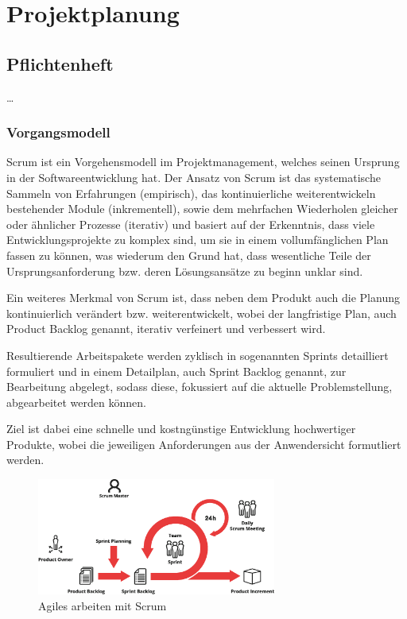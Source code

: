 
\chapter{Projektplanung} \label{Projektplanung}
\section{Pflichtenheft} \label{Pflichtenheft}

\ldots

\subsection{Vorgangsmodell} \label{Vorgangsmodell}
Scrum ist ein Vorgehensmodell im Projektmanagement, welches seinen Ursprung in der Softwareentwicklung hat.
Der Ansatz von Scrum ist das systematische Sammeln von Erfahrungen (empirisch), das kontinuierliche weiterentwickeln bestehender Module (inkrementell), sowie dem mehrfachen Wiederholen gleicher oder ähnlicher Prozesse (iterativ) und basiert auf der Erkenntnis, dass viele Entwicklungsprojekte zu komplex sind, um sie in einem vollumfänglichen Plan fassen zu können, was wiederum den Grund hat, dass wesentliche Teile der Ursprungsanforderung bzw. deren Lösungsansätze zu beginn unklar sind.

Ein weiteres Merkmal von Scrum ist, dass neben dem Produkt auch die Planung kontinuierlich verändert bzw. weiterentwickelt, wobei der langfristige Plan, auch Product Backlog genannt, iterativ verfeinert und verbessert wird.

Resultierende Arbeitspakete werden zyklisch in sogenannten Sprints detailliert formuliert und in einem Detailplan, auch Sprint Backlog genannt, zur Bearbeitung abgelegt, sodass diese, fokussiert auf die aktuelle Problemstellung, abgearbeitet werden können.

Ziel ist dabei eine schnelle und kostngünstige Entwicklung hochwertiger Produkte, wobei die jeweiligen Anforderungen aus der Anwendersicht formutliert werden.

\begin{figure}[h]
 \centering
 \includegraphics[width=0.7\textwidth]{pictures/scrum}
 \caption[Agiles arbeiten mit Scrum]{Agiles arbeiten mit Scrum \cite{scrum2018}}
 \label{fig:scrum}
\end{figure}

